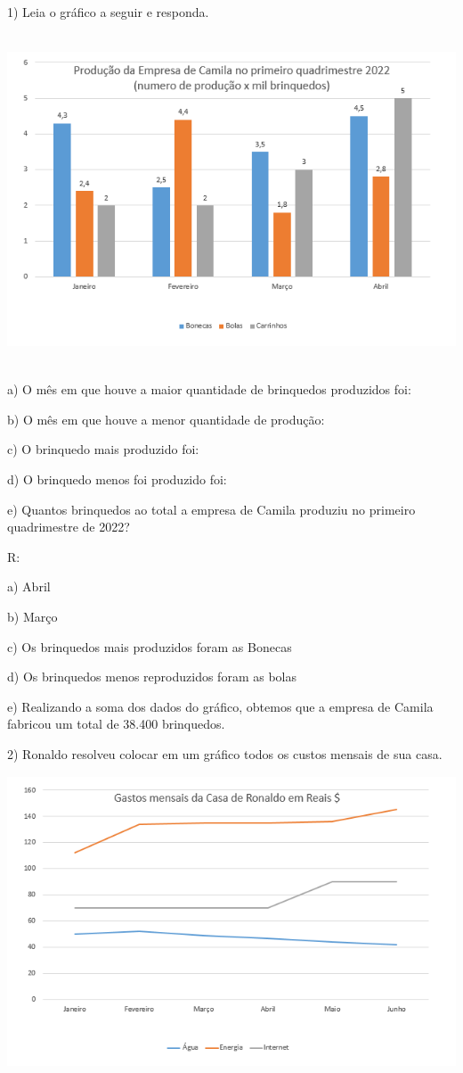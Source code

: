 
1) Leia o gráfico a seguir e responda.

\includegraphics[width=5.90625in,height=3.86458in]{./imgSAEB_8_MAT/media/image39.png}

a) O mês em que houve a maior quantidade de brinquedos produzidos foi:

b) O mês em que houve a menor quantidade de produção:

c) O brinquedo mais produzido foi:

d) O brinquedo menos foi produzido foi:

e) Quantos brinquedos ao total a empresa de Camila produziu no primeiro
quadrimestre de 2022?

R:

a) Abril

b) Março

c) Os brinquedos mais produzidos foram as Bonecas

d) Os brinquedos menos reproduzidos foram as bolas

e) Realizando a soma dos dados do gráfico, obtemos que a empresa de
Camila fabricou um total de 38.400 brinquedos.

2) Ronaldo resolveu colocar em um gráfico todos os custos mensais de sua
casa.

\includegraphics[width=5.30833in,height=3.41384in]{./imgSAEB_8_MAT/media/image40.png}

